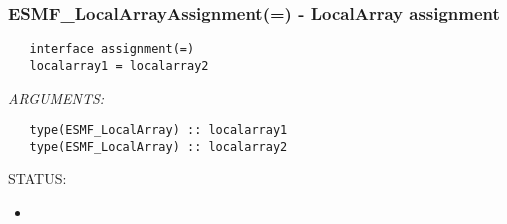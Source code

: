  
\setlength{\oldparskip}{\parskip}
\setlength{\parskip}{1.5ex}
\setlength{\oldparindent}{\parindent}
\setlength{\parindent}{0pt}
\setlength{\oldbaselineskip}{\baselineskip}
\setlength{\baselineskip}{11pt}
 
\def\bv{\begin{verbatim}}
\def\ev{\end{verbatim}}
\def\be{\begin{equation}}
\def\ee{\end{equation}}
\def\bea{\begin{eqnarray}}
\def\eea{\end{eqnarray}}
\def\bi{\begin{itemize}}
\def\ei{\end{itemize}}
\def\bn{\begin{enumerate}}
\def\en{\end{enumerate}}
\def\bd{\begin{description}}
\def\ed{\end{description}}
\def\({\left (}
\def\){\right )}
\def\[{\left [}
\def\]{\right ]}
\def\<{\left  \langle}
\def\>{\right \rangle}
\def\cI{{\cal I}}
\def\diag{\mathop{\rm diag}}
\def\tr{\mathop{\rm tr}}


 
\subsubsection [ESMF\_LocalArrayAssignment(=)] {ESMF\_LocalArrayAssignment(=) - LocalArray assignment}


  
\begin{verbatim}   interface assignment(=)
   localarray1 = localarray2\end{verbatim}{\em ARGUMENTS:}
\begin{verbatim}   type(ESMF_LocalArray) :: localarray1
   type(ESMF_LocalArray) :: localarray2\end{verbatim}
{\sf STATUS:}
   \begin{itemize}
   \item{}
   \end{itemize}
  

